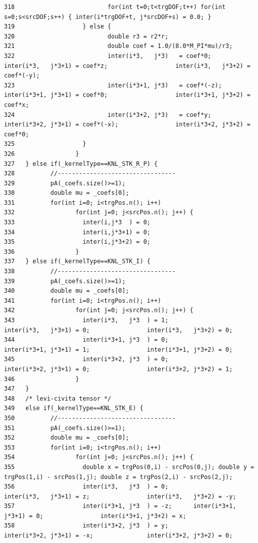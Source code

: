 \begin{verbatim}
318                          for(int t=0;t<trgDOF;t++) for(int s=0;s<srcDOF;s++) { inter(i*trgDOF+t, j*srcDOF+s) = 0.0; }
319                   } else {
320                          double r3 = r2*r;
321                          double coef = 1.0/(8.0*M_PI*mu)/r3;
322                          inter(i*3,   j*3)   = coef*0;                   inter(i*3,   j*3+1) = coef*z;                   inter(i*3,   j*3+2) = coef*(-y);
323                          inter(i*3+1, j*3)   = coef*(-z);                inter(i*3+1, j*3+1) = coef*0;                   inter(i*3+1, j*3+2) = coef*x;
324                          inter(i*3+2, j*3)   = coef*y;                   inter(i*3+2, j*3+1) = coef*(-x);                inter(i*3+2, j*3+2) = coef*0;
325                   }
326                 }
327   } else if(_kernelType==KNL_STK_R_P) {
328          //---------------------------------
329          pA(_coefs.size()>=1);
330          double mu = _coefs[0];
331          for(int i=0; i<trgPos.n(); i++)
332                 for(int j=0; j<srcPos.n(); j++) {
333                   inter(i,j*3  ) = 0;
334                   inter(i,j*3+1) = 0;
335                   inter(i,j*3+2) = 0;
336                 }
337   } else if(_kernelType==KNL_STK_I) {
338          //---------------------------------
339          pA(_coefs.size()>=1);
340          double mu = _coefs[0];
341          for(int i=0; i<trgPos.n(); i++)
342                 for(int j=0; j<srcPos.n(); j++) {
343                   inter(i*3,   j*3  ) = 1;               inter(i*3,   j*3+1) = 0;                inter(i*3,   j*3+2) = 0;
344                   inter(i*3+1, j*3  ) = 0;               inter(i*3+1, j*3+1) = 1;                inter(i*3+1, j*3+2) = 0;
345                   inter(i*3+2, j*3  ) = 0;               inter(i*3+2, j*3+1) = 0;                inter(i*3+2, j*3+2) = 1;
346                 }
347   }
348   /* levi-civita tensor */
349   else if(_kernelType==KNL_STK_E) {
350          //---------------------------------
351          pA(_coefs.size()>=1);
352          double mu = _coefs[0];
353          for(int i=0; i<trgPos.n(); i++)
354                 for(int j=0; j<srcPos.n(); j++) {
355                   double x = trgPos(0,i) - srcPos(0,j); double y = trgPos(1,i) - srcPos(1,j); double z = trgPos(2,i) - srcPos(2,j);
356                   inter(i*3,   j*3  ) = 0;               inter(i*3,   j*3+1) = z;                inter(i*3,   j*3+2) = -y;
357                   inter(i*3+1, j*3  ) = -z;      inter(i*3+1, j*3+1) = 0;                inter(i*3+1, j*3+2) = x;
358                   inter(i*3+2, j*3  ) = y;               inter(i*3+2, j*3+1) = -x;               inter(i*3+2, j*3+2) = 0;

\end{verbatim}
